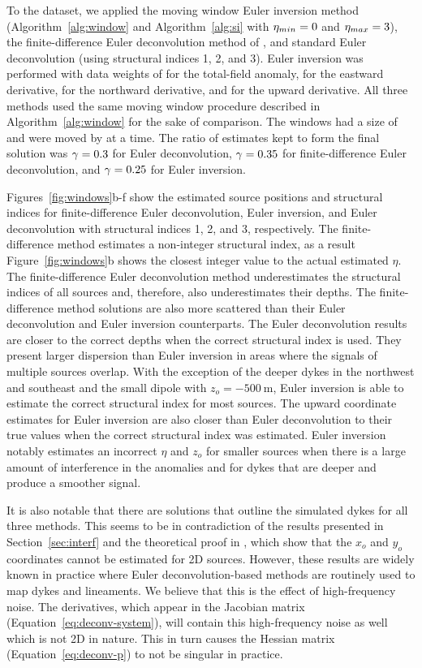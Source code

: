 To the dataset, we applied the moving window Euler inversion method
(Algorithm~\ref{alg:window} and Algorithm~\ref{alg:si} with
$\eta_{min}=0$ and $\eta_{max}=3$), the
finite-difference Euler deconvolution method
of \citet{Gerovska2005}, and standard Euler deconvolution (using structural
indices 1, 2, and 3).
Euler inversion was performed with data weights of \DefaultWeightsF{} for the
total-field anomaly, \DefaultWeightsE{} for the eastward derivative,
\DefaultWeightsN{} for the northward derivative, and \DefaultWeightsU{} for the
upward derivative.
All three methods used the same moving window procedure described in
Algorithm~\ref{alg:window} for the sake of comparison.
The windows had a size of \SynWinWindowSize{} and were moved by
\SynWinWindowStep{} at a time.
The ratio of estimates kept to form the final solution was
$\gamma=0.3$ for Euler deconvolution, $\gamma=0.35$ for
finite-difference Euler deconvolution, and $\gamma=0.25$ for Euler
inversion.

Figures~\ref{fig:windows}b-f show the estimated source positions and structural
indices for finite-difference Euler deconvolution, Euler inversion, and Euler
deconvolution with structural indices 1, 2, and 3, respectively.
The finite-difference method estimates a non-integer structural index, as
a result Figure~\ref{fig:windows}b shows the closest integer value to the
actual estimated $\eta$.
The finite-difference Euler deconvolution method underestimates the structural
indices of all sources and, therefore, also underestimates their depths.
The finite-difference method solutions are also more scattered than their Euler
deconvolution and Euler inversion counterparts.
The Euler deconvolution results are closer to the correct depths when the
correct structural index is used.
They present larger dispersion than Euler inversion in areas where the signals
of multiple sources overlap.
With the exception of the deeper dykes in the northwest and southeast and the
small dipole with $z_o=\qty{-500}{\m}$, Euler inversion is able to estimate the
correct structural index for most sources.
The upward coordinate estimates for Euler inversion are also closer than Euler
deconvolution to their true values when the correct structural index was
estimated.
Euler inversion notably estimates an incorrect $\eta$ and $z_o$ for smaller
sources when there is a large amount of interference in the anomalies and for
dykes that are deeper and produce a smoother signal.

It is also notable that there are solutions that outline the simulated dykes
for all three methods.
This seems to be in contradiction of the results presented in
Section~\ref{sec:interf} and the theoretical proof in
\citet{Mushayandebvu2004}, which show that the $x_o$ and $y_o$ coordinates
cannot be estimated for 2D sources.
However, these results are widely known in practice where Euler
deconvolution-based methods are routinely used to map dykes and lineaments.
We believe that this is the effect of high-frequency noise.
The derivatives, which appear in the Jacobian matrix
(Equation~\ref{eq:deconv-system}), will contain this high-frequency noise as
well which is not 2D in nature.
This in turn causes the Hessian matrix (Equation~\ref{eq:deconv-p}) to not be
singular in practice.



